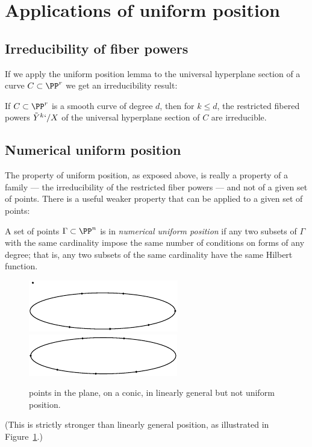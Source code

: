 \section{Applications of uniform position}
\subsection*{Irreducibility of fiber powers}

If we apply the uniform position lemma to the universal hyperplane
section of a curve $C \subset \PP^r$ we get an irreducibility result:

\begin{corollary}\label{hyperplane section monodromy} If $C\subset \PP^r$
is a smooth curve of degree $d$, then
for $k\leq d$, the restricted fibered powers $\tilde Y^k`/X$  of the
universal hyperplane section
of $C$ are irreducible.
\end{corollary}

\subsection*{Numerical uniform position}

The property of uniform position, as exposed above, is really a property
of a family --- the irreducibility of the restricted
fiber powers --- and not of a given set of points. There is a useful
weaker property that
can be applied to a given set of points:

\begin{definition}
 A set of points $\Gamma\subset \PP^n$ is in \emph{numerical uniform
 position} if
 any two subsets of $\Gamma$ with the same cardinality impose the same
 number of conditions on forms of any degree; that is, any two subsets
 of the same cardinality have the same Hilbert function.
%
\begin{figure}
\leavevmode
\vbox{\offinterlineskip
\hbox{\includegraphics[scale=1.3,viewport=-10 37 118 39,clip]{main/Fig10-2}}%
\hbox{\includegraphics[scale=1.3,viewport=0 0 118 33,clip]{main/Fig10-2a}}}
\caption{
points in the plane,
on a conic, in linearly general 
but not 
uniform position.}
\label{numerical uniform is stronger}
\end{figure}
%
(This is strictly stronger than linearly general position, as illustrated
in Figure~\ref{numerical uniform is stronger}.)
\end{definition}


